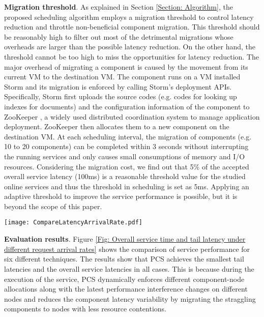 \documentclass[10pt, conference, compsocconf]{IEEEtran}
\begin{document}
\textbf{Migration threshold}. As explained in Section \ref{Section: Algorithm}, the proposed scheduling algorithm employs a migration threshold to control latency reduction and throttle non-beneficial component migration. This threshold should be reasonably high to filter out most of the detrimental migrations whose overheads are larger than the possible latency reduction. On the other hand, the threshold cannot be too high to miss the opportunities for latency reduction.
The major overhead of migrating a component is caused by the movement from its current VM to the destination VM. The component runs on a VM installed Storm and its migration is enforced by calling Storm's deployment APIs. Specifically, Storm first uploads the source codes (e.g. codes for looking up indexes for documents) and the configuration information of the component to ZooKeeper \cite{ZooKeeperWebsite}, a widely used distributed coordination system to manage application deployment. ZooKeeper then allocates them to a new component on the destination VM. At each scheduling interval, the migration of components (e.g. 10 to 20 components) can be completed within 3 seconds without interrupting the running services and only causes small consumptions of memory and I/O resources.
Considering the migration cost, we find out that 5\% of the accepted overall service latency (100ms) is a reasonable threshold value for the studied online services and thus the threshold in scheduling is set as 5ms. Applying an adaptive threshold to improve the service performance is possible, but it is beyond the scope of this paper.











\begin{figure*}
\centering
  \texttt{[image: CompareLatencyArrivalRate.pdf]}\\
  \caption{Comparison of overall service latency and the tail latency under different request arrival rates}
  \label{Fig: Overall service time and tail latency under different request arrival rates}
\end{figure*}

\textbf{Evaluation results}.
Figure \ref{Fig: Overall service time and tail latency under different request arrival rates} shows the comparison of service performance for six different techniques. The results show that PCS achieves the smallest tail latencies and the overall service latencies in all cases. This is because during the execution of the service, PCS dynamically enforces different component-node allocations along with the latest performance interference changes on different nodes and reduces the component latency variability by migrating the straggling components to nodes with less resource contentions.
\end{document}
